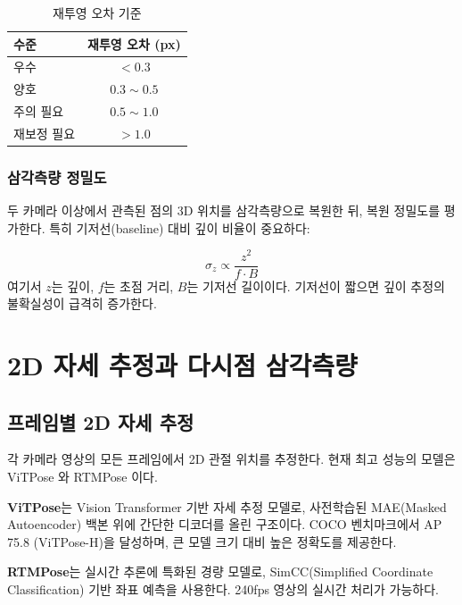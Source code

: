 \documentclass[11pt, a4paper]{report}
\begin{document}
\begin{table}[H]
\centering
\caption{재투영 오차 기준}
\begin{tabular}{lc}
\toprule
\textbf{수준} & \textbf{재투영 오차 (px)} \\
\midrule
우수 & $< 0.3$ \\
양호 & $0.3 \sim 0.5$ \\
주의 필요 & $0.5 \sim 1.0$ \\
재보정 필요 & $> 1.0$ \\
\bottomrule
\end{tabular}
\end{table}

\subsection{삼각측량 정밀도}

두 카메라 이상에서 관측된 점의 3D 위치를 삼각측량으로 복원한 뒤,
복원 정밀도를 평가한다. 특히 기저선(baseline) 대비 깊이 비율이 중요하다:

\begin{equation}
  \sigma_z \propto \frac{z^2}{f \cdot B}
\end{equation}
여기서 $z$는 깊이, $f$는 초점 거리, $B$는 기저선 길이이다.
기저선이 짧으면 깊이 추정의 불확실성이 급격히 증가한다.


\chapter{2D 자세 추정과 다시점 삼각측량}

\section{프레임별 2D 자세 추정}

각 카메라 영상의 모든 프레임에서 2D 관절 위치를 추정한다.
현재 최고 성능의 모델은 ViTPose \cite{xu2022vitpose}와 RTMPose \cite{jiang2023rtmpose}이다.

\begin{cvbox}
\textbf{ViTPose}는 Vision Transformer 기반 자세 추정 모델로,
사전학습된 MAE(Masked Autoencoder) 백본 위에 간단한 디코더를 올린 구조이다.
COCO 벤치마크에서 AP 75.8 (ViTPose-H)을 달성하며,
큰 모델 크기 대비 높은 정확도를 제공한다.

\textbf{RTMPose}는 실시간 추론에 특화된 경량 모델로,
SimCC(Simplified Coordinate Classification) 기반 좌표 예측을 사용한다.
240fps 영상의 실시간 처리가 가능하다.
\end{cvbox}
\end{document}
